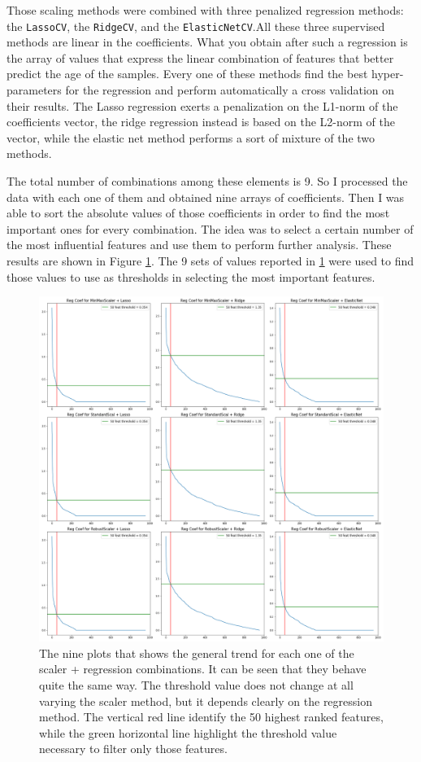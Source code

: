 \documentclass[11pt,a4paper]{report}
\begin{document}
Those scaling methods were combined with three penalized regression methods: the \texttt{LassoCV}, the \texttt{RidgeCV}, and the \texttt{ElasticNetCV}.All these three supervised methods are linear in the coefficients. What you obtain after such a regression is the array of values that express the linear combination of features that better predict the age of the samples. Every one of these methods find the best hyper-parameters for the regression and perform automatically a cross validation on their results.  The Lasso regression exerts a penalization on the L1-norm of the coefficients vector, the ridge regression instead is based on the L2-norm of the vector, while the elastic net method performs a sort of mixture of the two methods.

The total number of combinations among these elements is 9. So I processed the data with each one of them and obtained nine arrays of coefficients. Then I was able to sort the absolute values of those coefficients in order to find the most important ones for every combination. The idea was to select a certain number of the most influential features and use them to perform further analysis. These results are shown in Figure \ref{fig:NineCoefPlot}. The 9 sets of values reported in \ref{fig:NineCoefPlot} were used to find those values to use as thresholds in selecting the most important features.

\begin{figure}[ht!]
  \begin{center}
  \includegraphics[width=0.7\linewidth]{NineCoefPlot.png}
  \caption{\small{The nine plots that shows the general trend for each one of the scaler + regression combinations. It can be seen that they behave quite the same way. The threshold value does not change at all varying the scaler method, but it depends clearly on the regression method. The vertical red line identify the 50 highest ranked features, while the green horizontal line highlight the threshold value necessary to filter only those features.}}
  \label{fig:NineCoefPlot}
  \end{center}
\end{figure}
\end{document}
